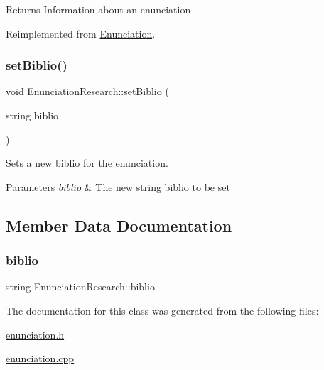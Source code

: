 \begin{DoxyReturn}{Returns}
Information about an enunciation 
\end{DoxyReturn}


Reimplemented from \hyperlink{class_enunciation_a032b5ff494595ab52d152d605544525c}{Enunciation}.

\mbox{\label{class_enunciation_research_afc23a08d1cce9f77f64c664614f7a4fc}} 
\subsubsection{\texorpdfstring{set\+Biblio()}{setBiblio()}}
{\footnotesize\ttfamily void Enunciation\+Research\+::set\+Biblio (\begin{DoxyParamCaption}\item[{string}]{biblio }\end{DoxyParamCaption})}



Sets a new biblio for the enunciation. 


\begin{DoxyParams}{Parameters}
{\em biblio} & The new string biblio to be set \\
\hline
\end{DoxyParams}


\subsection{Member Data Documentation}
\mbox{\label{class_enunciation_research_a425da04eb657de83211819d1af3fc640}} 
\subsubsection{\texorpdfstring{biblio}{biblio}}
{\footnotesize\ttfamily string Enunciation\+Research\+::biblio\hspace{0.3cm}{\ttfamily [protected]}}



The documentation for this class was generated from the following files\+:\begin{DoxyCompactItemize}
\item 
\hyperlink{enunciation_8h}{enunciation.\+h}\item 
\hyperlink{enunciation_8cpp}{enunciation.\+cpp}\end{DoxyCompactItemize}

